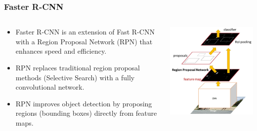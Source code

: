 \documentclass{beamer}
\begin{document}
\begin{frame}
    \frametitle{Faster R-CNN}

    \begin{columns}
        \begin{column}{0.5\textwidth}
            \begin{itemize}
                \item Faster R-CNN is an extension of Fast R-CNN with a Region Proposal Network (RPN) that enhances speed and efficiency.
                \item RPN replaces traditional region proposal methods (Selective Search) with a fully convolutional network.
                \item RPN improves object detection by proposing regions (bounding boxes) directly from feature maps.
            \end{itemize}
        \end{column}

        \begin{column}{0.5\textwidth}
            \includegraphics[width=\linewidth]{slide12.png} 
        \end{column}
    \end{columns}
\end{frame}
\end{document}
